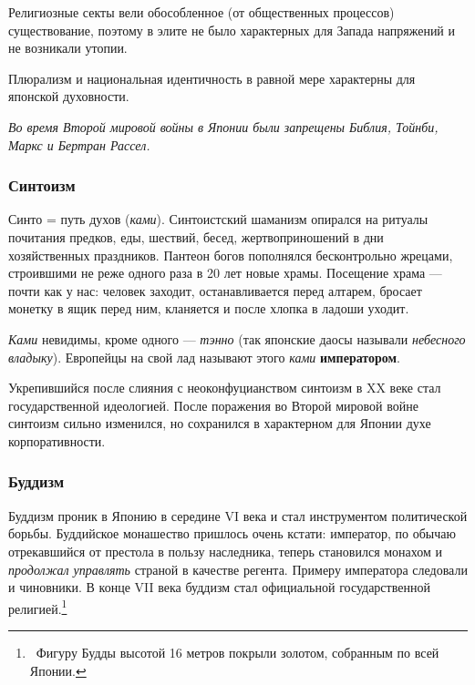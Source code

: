 \documentclass[a4paper]{article}
\begin{document}
{
Религиозные секты вели обособленное (от общественных процессов) существование, поэтому в элите не было характерных для
Запада напряжений и не возникали утопии. }

{
Плюрализм и национальная идентичность в равной мере характерны для японской духовности. }

{\itshape
Во время Второй мировой войны в Японии были запрещены Библия, Тойнби, Маркс и Бертран Рассел.}

\subsubsection{Синтоизм}
{
Синто = путь духов (\textit{ками}). Синтоистский шаманизм опирался на ритуалы почитания предков, еды, шествий, бесед,
жертвоприношений в дни хозяйственных праздников. Пантеон богов пополнялся бесконтрольно жрецами, строившими не реже
одного раза в 20 лет новые храмы. Посещение храма — почти как у нас: человек заходит, останавливается перед
{\textquotedbl}алтарем{\textquotedbl}, бросает монетку в ящик перед ним, кланяется и после хлопка в ладоши уходит. }

{
\textit{Ками }невидимы, кроме одного — \textit{тэнно} (так японские даосы называли \textit{небесного владыку}).
Европейцы на свой лад называют этого \textit{ками }\textbf{императором}. \textbf{\ }\ }

{
Укрепившийся после слияния с неоконфуцианством синтоизм в \foreignlanguage{english}{XX} веке стал государственной
идеологией. После поражения во Второй мировой войне синтоизм сильно изменился, но сохранился в характерном для Японии
духе корпоративности.}

\subsubsection{Буддизм}
{
Буддизм проник в Японию в середине \foreignlanguage{english}{VI} века и стал инструментом политической борьбы.
Буддийское монашество пришлось очень кстати: император, по обычаю отрекавшийся от престола в пользу наследника, теперь
становился монахом и \textit{продолжал управлять} страной в качестве регента. Примеру императора следовали и чиновники.
В конце \foreignlanguage{english}{VII} века буддизм стал официальной государственной
религией.\footnote{\foreignlanguage{russian}{\ Фигуру Будды высотой 16 метров покрыли золотом, собранным по всей
Японии.}}}
\end{document}
